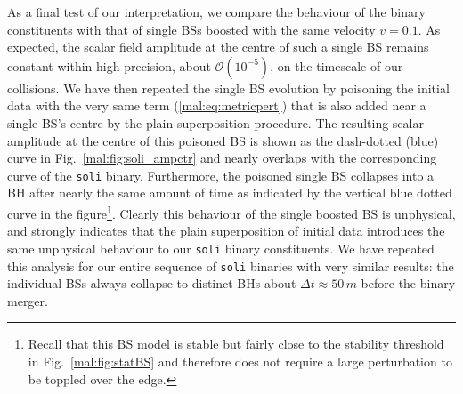 As a final test of our interpretation, we compare the behaviour
of the binary constituents with that of single BSs boosted with the
same velocity $v=0.1$. As expected, the scalar field amplitude at
the centre of such a single BS remains constant within high precision,
about $\mathcal{O}(10^{-5})$, on the timescale of our collisions.
We have then repeated the single BS evolution by poisoning the initial
data with the very same term (\ref{mal:eq:metricpert}) that is also
added near a single BS's centre by the plain-superposition procedure.
The resulting scalar amplitude at the centre of this poisoned
BS is shown as the dash-dotted (blue) curve in
Fig.~\ref{mal:fig:soli_ampctr} and nearly overlaps with the corresponding
curve of the {\tt soli} binary. Furthermore, the poisoned single
BS collapses into a BH after nearly the same amount of time as indicated
\setcounter{footnote}{4}
by the vertical blue dotted curve in the figure\footnote{
Recall that this BS model is stable but fairly close
to the stability threshold in Fig.~\ref{mal:fig:statBS}
and therefore does not require a large perturbation to be
toppled over the edge.}.
Clearly this
behaviour of the single boosted BS is unphysical, and strongly
indicates that the plain superposition of initial data introduces
the same unphysical behaviour to our {\tt soli} binary constituents.
We have repeated this analysis for our entire sequence of
{\tt soli} binaries with very similar results: the individual
BSs always collapse to distinct BHs about $\Delta t\approx 50\,m$
before the binary merger.

